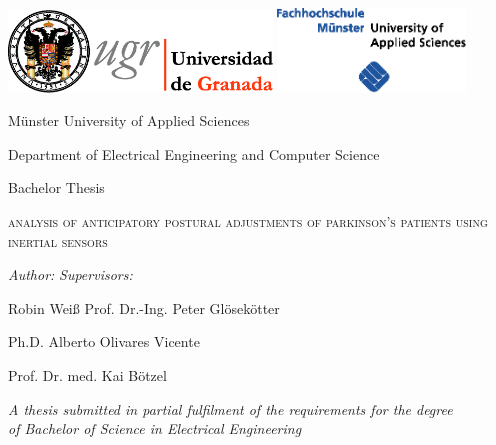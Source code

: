 \begin{titlepage}
\label{ch:titlepage}

\begin{center}

\includegraphics[width=7cm]{images/universidad_de_granada.eps}
	\hfill
\includegraphics[width=5cm]{images/fh-muenster.eps}
	\hspace{0.5cm} 

\vspace{3cm}

{\large Münster University of Applied Sciences}

Department of Electrical Engineering and Computer Science

\vspace{1cm}

{\Large Bachelor Thesis}

\vspace{1cm}

\textsc{\huge analysis of anticipatory postural 
\vspace{0.15cm}
adjustments of parkinson's patients using inertial sensors}

\end{center}

\vspace{1cm}

\textit{Author:}  \hfill \textit{Supervisors:}

Robin Weiß \hfill Prof. Dr.-Ing. Peter Gl\"{o}sek\"{o}tter 

\hfill Ph.D. Alberto Olivares Vicente

\hfill Prof. Dr. med. Kai B\"{o}tzel

\vspace{1cm}

\begin{center}
	
\textit{A thesis submitted in partial fulfilment of the requirements for the degree\\
of Bachelor of Science in Electrical Engineering}

\vfill

\monthname \: \the\year 

\end{center}

\end{titlepage}
